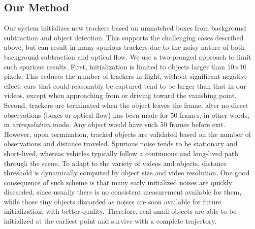\subsection{Our Method}
Our system initializes new trackers based on unmatched boxes from background subtraction and object detection. This supports the challenging cases described above, but can result in many spurious trackers due to the noisy nature of both background subtraction and optical flow. We use a two-pronged approach to limit such spurious results. First, initialization is limited to objects larger than 10$\times$10 pixels. This reduces the number of trackers in flight, without significant negative effect: 
cars that could reasonably be captured tend to be larger than that in our videos, except when approaching from or driving toward the vanishing point. 
Second, trackers are terminated when the object leaves the frame, after no direct observations (boxes or optical flow) has been made for 50 frames, in other words, in \emph{extrapolation} mode. Any object would have such 50 frames before exit. However, upon termination, tracked objects are validated based on the number of observations and distance traveled. Spurious noise tends to be stationary and short-lived, whereas vehicles typically follow a continuous and long-lived path through the scene. To adapt to the variety of videos and objects, distance threshold is dynamically computed by object size and video resolution. 
One good consequence of such scheme is that many early initialized noises are quickly discarded, since usually there is no consistent measurement available for them, while those tiny objects discarded as noises are soon available for future initialization, with better quality. Therefore, real small objects are able to be initialized at the earliest point and survive with a complete trajectory. 


